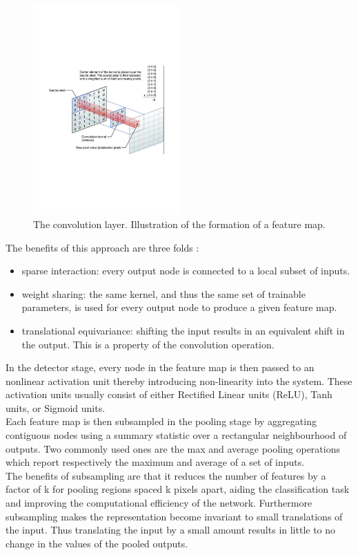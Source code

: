 \begin{figure}
\centering
\includegraphics[trim=2cm 7cm 2cm 7cm, clip=true, height=80mm]{Chapter2/convolution.pdf}
\caption{The convolution layer. Illustration of the formation of a feature map.}
\end{figure}

\noindent The benefits of this approach are three folds :

\begin{itemize}
	\item sparse interaction: every output node is connected to a local subset of inputs.
	\item weight sharing: the same kernel, and thus the same set of trainable parameters, is used for every output node to produce a given feature map. 
	\item translational equivariance: shifting the input results in an equivalent shift in the output. This is a property of the convolution operation.
\end{itemize}

\noindent In the detector stage, every node in the feature map is then passed to an nonlinear activation unit thereby introducing non-linearity into the system. These activation units usually consist of either Rectified Linear units (ReLU), Tanh units, or Sigmoid units.\\

\noindent Each feature map is then subsampled in the pooling stage by aggregating contiguous nodes using a summary statistic over a rectangular neighbourhood of outputs. Two commonly used ones are the max and average pooling operations which report respectively the maximum and average of a set of inputs.\\

\noindent The benefits of subsampling are that it reduces the number of features by a factor of k for pooling regions spaced k pixels apart, aiding the classification task and improving the computational efficiency of the network. Furthermore subsampling makes the representation become invariant to small translations of the input. Thus translating the input by a small amount results in little to no change in the values of the pooled outputs.\\

